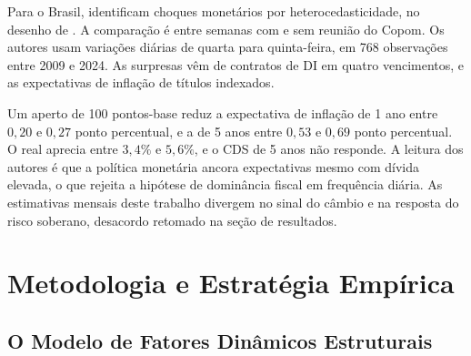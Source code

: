 \documentclass[
article,			%
12pt,				%
oneside,			%
a4paper,			%
hidelinks, 
english,			%
brazil,				%
]{abntex2}
\theoremstyle{plain}
\theoremstyle{definition}
\theoremstyle{remark}
\begin{document}

Para o Brasil,  identificam choques monetários por heterocedasticidade, no desenho de . A comparação é entre semanas com e sem reunião do Copom. Os autores usam variações diárias de quarta para quinta-feira, em 768 observações entre 2009 e 2024. As surpresas vêm de contratos de DI em quatro vencimentos, e as expectativas de inflação de títulos indexados.

Um aperto de 100 pontos-base reduz a expectativa de inflação de 1 ano entre $0{,}20$ e $0{,}27$ ponto percentual, e a de 5 anos entre $0{,}53$ e $0{,}69$ ponto percentual. O real aprecia entre $3{,}4\%$ e $5{,}6\%$, e o CDS de 5 anos não responde. A leitura dos autores é que a política monetária ancora expectativas mesmo com dívida elevada, o que rejeita a hipótese de dominância fiscal em frequência diária. As estimativas mensais deste trabalho divergem no sinal do câmbio e na resposta do risco soberano, desacordo retomado na seção de resultados.


\section{Metodologia e Estratégia Empírica}
\label{sec:metodologia}

\subsection{O Modelo de Fatores Dinâmicos Estruturais}
\end{document}
